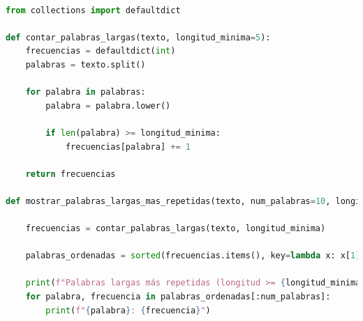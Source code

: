 \documentclass[journal, spanish]{IEEEtran}
\begin{document}
\lstset{style=codestyle}
\begin{lstlisting}[language=Python]

from collections import defaultdict

def contar_palabras_largas(texto, longitud_minima=5):
    frecuencias = defaultdict(int)
    palabras = texto.split()

    for palabra in palabras:
        palabra = palabra.lower()

        if len(palabra) >= longitud_minima:
            frecuencias[palabra] += 1

    return frecuencias

def mostrar_palabras_largas_mas_repetidas(texto, num_palabras=10, longitud_minima=5):

    frecuencias = contar_palabras_largas(texto, longitud_minima)

    palabras_ordenadas = sorted(frecuencias.items(), key=lambda x: x[1], reverse=True)

    print(f"Palabras largas más repetidas (longitud >= {longitud_minima}, top {num_palabras}):")
    for palabra, frecuencia in palabras_ordenadas[:num_palabras]:
        print(f"{palabra}: {frecuencia}")


\end{lstlisting}
\end{document}
